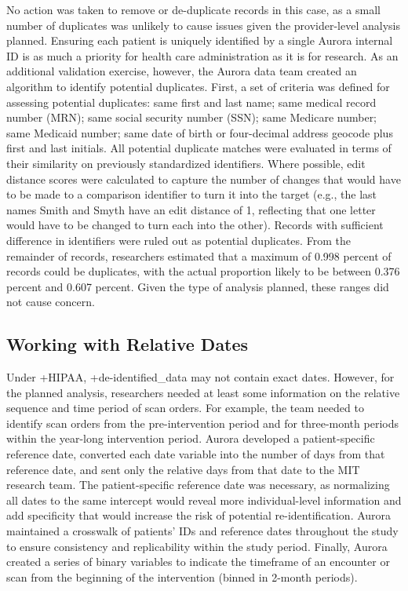 \documentclass[
]{book}
\begin{document}
No action was taken to remove or de-duplicate records in this case, as a small number of duplicates was unlikely to cause issues given the provider-level analysis planned. Ensuring each patient is uniquely identified by a single Aurora internal ID is as much a priority for health care administration as it is for research. As an additional validation exercise, however, the Aurora data team created an algorithm to identify potential duplicates. First, a set of criteria was defined for assessing potential duplicates: same first and last name; same medical record number (MRN); same social security number (SSN); same Medicare number; same Medicaid number; same date of birth or four-decimal address geocode plus first and last initials. All potential duplicate matches were evaluated in terms of their similarity on previously standardized identifiers. Where possible, edit distance scores were calculated to capture the number of changes that would have to be made to a comparison identifier to turn it into the target (e.g., the last names Smith and Smyth have an edit distance of 1, reflecting that one letter would have to be changed to turn each into the other). Records with sufficient difference in identifiers were ruled out as potential duplicates. From the remainder of records, researchers estimated that a maximum of 0.998 percent of records could be duplicates, with the actual proportion likely to be between 0.376 percent and 0.607 percent. Given the type of analysis planned, these ranges did not cause concern.

\hypertarget{working-with-relative-dates}{%
\subsection{Working with Relative Dates}\label{working-with-relative-dates}}

Under +HIPAA\textbar, +de-identified\_data\textbar{} may not contain exact dates. However, for the planned analysis, researchers needed at least some information on the relative sequence and time period of scan orders. For example, the team needed to identify scan orders from the pre-intervention period and for three-month periods within the year-long intervention period. Aurora developed a patient-specific reference date, converted each date variable into the number of days from that reference date, and sent only the relative days from that date to the MIT research team. The patient-specific reference date was necessary, as normalizing all dates to the same intercept would reveal more individual-level information and add specificity that would increase the risk of potential re-identification. Aurora maintained a crosswalk of patients' IDs and reference dates throughout the study to ensure consistency and replicability within the study period. Finally, Aurora created a series of binary variables to indicate the timeframe of an encounter or scan from the beginning of the intervention (binned in 2-month periods).
\end{document}
